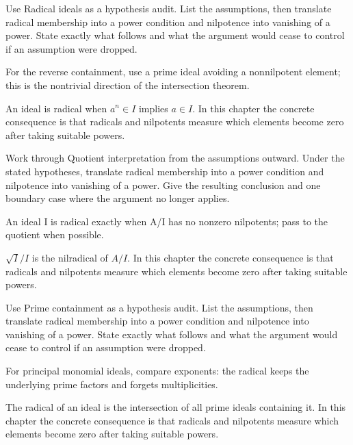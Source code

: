 \begin{exercise}\label{exr:v03-04}
Use Radical ideals as a hypothesis audit. List the assumptions, then translate radical membership into a power condition and nilpotence into vanishing of a power. State exactly what follows and what the argument would cease to control if an assumption were dropped.
\end{exercise}
\begin{hint}
For the reverse containment, use a prime ideal avoiding a nonnilpotent element; this is the nontrivial direction of the intersection theorem.
\end{hint}
\begin{solution}
An ideal is radical when $a^n\in I$ implies $a\in I$. In this chapter the concrete consequence is that radicals and nilpotents measure which elements become zero after taking suitable powers.
\end{solution}

\begin{exercise}\label{exr:v03-05}
Work through Quotient interpretation from the assumptions outward. Under the stated hypotheses, translate radical membership into a power condition and nilpotence into vanishing of a power. Give the resulting conclusion and one boundary case where the argument no longer applies.
\end{exercise}
\begin{hint}
An ideal I is radical exactly when A/I has no nonzero nilpotents; pass to the quotient when possible.
\end{hint}
\begin{solution}
$\sqrt I/I$ is the nilradical of $A/I$. In this chapter the concrete consequence is that radicals and nilpotents measure which elements become zero after taking suitable powers.
\end{solution}

\begin{exercise}\label{exr:v03-06}
Use Prime containment as a hypothesis audit. List the assumptions, then translate radical membership into a power condition and nilpotence into vanishing of a power. State exactly what follows and what the argument would cease to control if an assumption were dropped.
\end{exercise}
\begin{hint}
For principal monomial ideals, compare exponents: the radical keeps the underlying prime factors and forgets multiplicities.
\end{hint}
\begin{solution}
The radical of an ideal is the intersection of all prime ideals containing it. In this chapter the concrete consequence is that radicals and nilpotents measure which elements become zero after taking suitable powers.
\end{solution}

